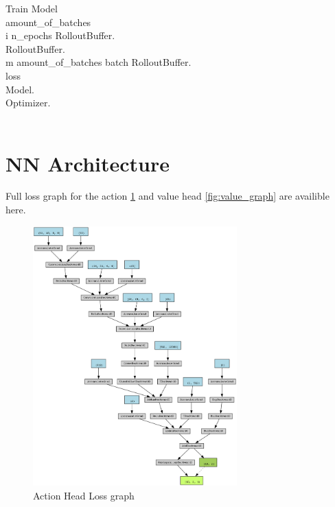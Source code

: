 \renewcommand{\thepseudonum}{\roman{pseudonum}}
\begin{pseudocode}{Train Model}{ }
    \\

    amount\_of\_batches \GETS {}\\
    \FOR i  \TO n\_epochs \DO
    \BEGIN
    RolloutBuffer.\\
    RolloutBuffer.\\
    \FOR m  \TO amount\_of\_batches \DO
    \BEGIN
    batch \GETS RolloutBuffer.\\
    loss \GETS {}\\
    Model.\\
    Optimizer.\\
    \END\\
    \END
    \ENDPROCEDURE
    \label{pseudocode:train_model}
\end{pseudocode}

\section{\ac{NN} Architecture}

Full loss graph for the action \ref{fig:action_graph} and value head \ref{fig:value_graph} are availible here.

\begin{figure}
    \centering
    \includegraphics[width=0.7\textwidth]{Bilder/action_graph.png}
    \caption{Action Head Loss graph}
    \label{fig:action_graph}
\end{figure}

